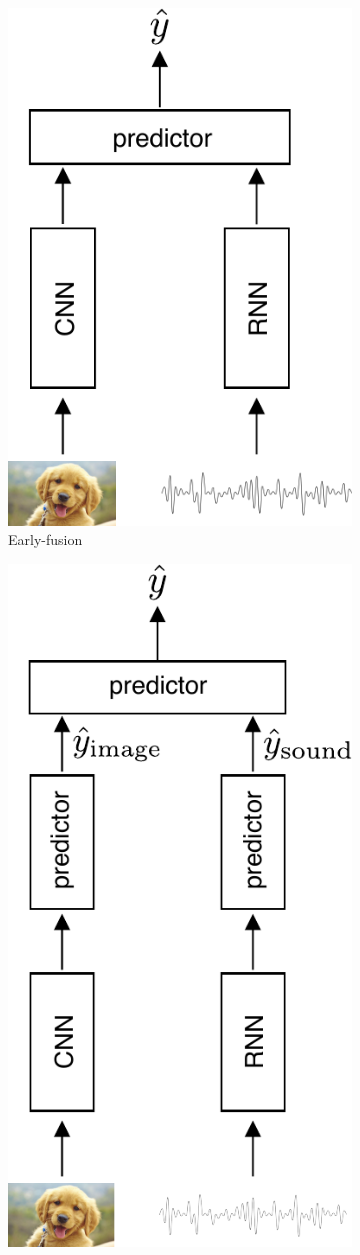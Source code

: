 \begin{figure}[!h]
\centering
\begin{subfigure}{.45\textwidth}
\vspace*{15.5mm}
  \centering
  \includegraphics[width=.55\linewidth]{figures/early-fusion}
  \vspace*{3mm}
  \caption{Early-fusion}
  \label{fig:early-fusion}
\end{subfigure}%
\begin{subfigure}{.45\textwidth}
  \centering
  \includegraphics[width=.55\linewidth]{figures/late-fusion}

\end{subfigure}
\end{figure}

